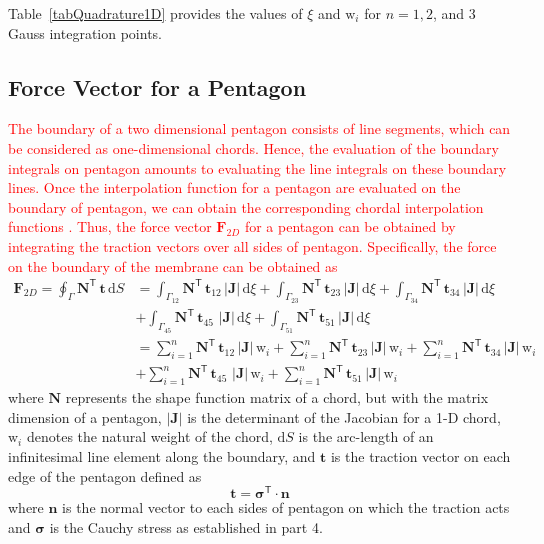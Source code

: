 Table~\ref{tabQuadrature1D} provides the values of $\xi$ and $\mathrm{w}_i$ for $n = 1, 2$, and $3$ Gauss integration points.

\subsection{Force Vector for a Pentagon}
\textcolor{red}{The boundary of a two dimensional pentagon consists of line segments, which can be considered as one-dimensional chords. Hence, the evaluation of the boundary integrals on pentagon amounts to evaluating the line integrals on these boundary lines. Once the interpolation function for a pentagon are evaluated on the boundary of pentagon, we can obtain the corresponding chordal interpolation functions \cite{Reddy93}.
	Thus, the force vector $\mathbf{F}_{2D}$  for a pentagon can be obtained by integrating the traction vectors over all sides of pentagon. Specifically, the force on the boundary of the membrane can be obtained as}
\begin{equation}
\begin{aligned}
\mathbf{F}_{2D}  = \oint_{\Gamma} \mathbf{N}^{\mathsf{T}} \, \mathbf{t} \, \mathrm{d} S & = \int_{\Gamma_{12}} \mathbf{N}^{\mathsf{T}} \, \mathbf{t}_{12} \,|\mathbf{J}| \, \mathrm{d} \xi + \int_{\Gamma_{23}} \mathbf{N}^{\mathsf{T}} \, \mathbf{t}_{23} \,|\mathbf{J}| \, \mathrm{d} \xi + \int_{\Gamma_{34}} \mathbf{N}^{\mathsf{T}} \, \mathbf{t}_{34} \,|\mathbf{J}| \, \mathrm{d} \xi \\
& + \int_{\Gamma_{45}} \mathbf{N}^{\mathsf{T}} \, \mathbf{t}_{45} \, \,|\mathbf{J}| \, \mathrm{d} \xi + \int_{\Gamma_{51}} \mathbf{N}^{\mathsf{T}} \, \mathbf{t}_{51} \,|\mathbf{J}| \, \mathrm{d} \xi \\
& = \sum_{i=1}^{n} \mathbf{N}^{\mathsf{T}} \, \mathbf{t}_{12} \,|\mathbf{J}| \, \mathrm{w}_i + \sum_{i=1}^{n} \mathbf{N}^{\mathsf{T}} \, \mathbf{t}_{23} \,|\mathbf{J}| \, \mathrm{w}_i + \sum_{i=1}^{n} \mathbf{N}^{\mathsf{T}} \, \mathbf{t}_{34} \,|\mathbf{J}| \, \mathrm{w}_i \\
& + \sum_{i=1}^{n} \mathbf{N}^{\mathsf{T}} \, \mathbf{t}_{45} \, \,|\mathbf{J}| \, \mathrm{w}_i + \sum_{i=1}^{n} \mathbf{N}^{\mathsf{T}} \, \mathbf{t}_{51} \,|\mathbf{J}| \, \mathrm{w}_i
\end{aligned}
\end{equation}
where $\mathbf{N}$ represents the shape function matrix of a chord, but with the matrix dimension of a pentagon, $|\mathbf{J}|$ is the determinant of the Jacobian for a 1-D chord, $\mathrm{w}_i$ denotes the natural weight of the chord, $\mathrm{d} S$ is the arc-length of an infinitesimal line element along the boundary, and $\mathbf{t}$ is the traction vector on each edge of the pentagon defined as
\begin{equation}
\mathbf{t} = \boldsymbol{\sigma}^{\mathsf{T}} \cdot \mathbf{n} 
\end{equation}
where $ \mathbf{n} $ is the normal vector to each sides of pentagon on which the traction acts and $ \boldsymbol{\sigma} $ is the Cauchy stress as established in part 4.

